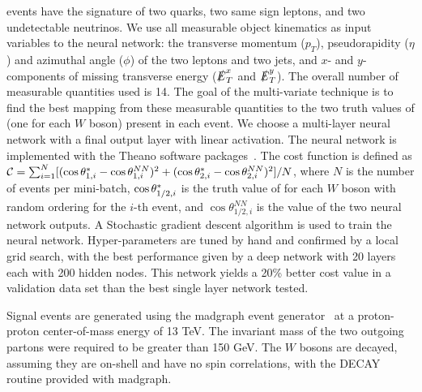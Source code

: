 \ssWW events have the signature of two quarks, two same sign leptons, and
two undetectable neutrinos.  We use all measurable object kinematics as input variables
to the neural network: the transverse momentum ($p_T$), pseudorapidity ($\eta$) and
azimuthal angle ($\phi$) of the two leptons and two jets, and $x$- and $y$-components 
of missing transverse energy ($\slashed{E}_T^x$ and
$\slashed{E}_T^y$).  The overall number of measurable quantities used is 14. 
The goal of the multi-variate technique is to find
the best mapping from these measurable quantities to the two truth
values of \cts (one for each $W$ boson) present in each event.  We
choose a multi-layer neural network with a final output layer with
linear activation. The neural network is implemented with the Theano
software packages~\cite{theano1,theano2}. The cost function is defined as 
${\cal{C}}= \sum_{i=1}^{N} [(\ctsnb_{1,i} -\cos \theta^{NN}_{1,i})^2+(\ctsnb_{2,i}-\cos \theta^{NN}_{2,i})^2]/N$, 
where $N$ is the number of events per mini-batch,
$ \cos  \theta^{*}  _{1/2,i}$ is the truth value of \cts for each $W$ boson with
random ordering for the $i$-th event, and $\cos \theta^{NN}_{1/2, i}$ is the value of
the two neural network outputs. A Stochastic gradient descent
algorithm is used to train the neural network. Hyper-parameters are tuned by hand and confirmed
by a local grid search, with the best performance given by a deep network with 20 layers each with 200 hidden nodes.
This network yields a 20\% better cost value in a validation data set than the best single layer network tested.   


Signal \ssWW events are generated using the {\sc madgraph} event generator~\cite{madgraph} at a proton-proton center-of-mass energy of 13 TeV. %
 The invariant mass of the two outgoing partons were required to be greater than 150 GeV. The $W$ bosons are decayed, assuming they are on-shell and have no spin correlations, with the DECAY routine provided with {\sc madgraph}.%

